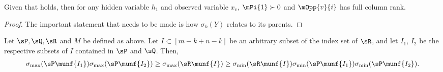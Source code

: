 \begin{lemma}
  \label{lem:full-rank-suff}
  Given that  holds, then for any hidden
  variable $h_1$ and observed variable $x_v$, $\mPi{1} \succ 0$ and
  $\mOpp{v}{i}$ has full column rank.
\end{lemma}
\begin{proof}
  The important statement that needs to be made is how $\sigma_k(Y)$
  relates to its parents.
\end{proof}

\begin{lemma}
  \label{lem:tensor-multiplication}
Let $\sP, \sQ, \sR$ and $M$ be defined as above. 
Let $I \subset [m - k + n - k]$ be an arbitrary subset of the index set of $\sR$,
  and let $I_1$, $I_2$ be the respective subsets of $I$ contained in $\sP$ and $\sQ$.
Then,
\begin{align}
  \sigma_{\max}(\sP\munf{I_1}) \sigma_{\max}(\sP\munf{I_2}) 
\ge \sigma_{\max}(\sR\munf{I}) 
\ge \sigma_{\min}(\sR\munf{I}) 
\sigma_{\min}(\sP\munf{I_1}) \sigma_{\min}(\sP\munf{I_2}).
\end{align}
\end{lemma}
